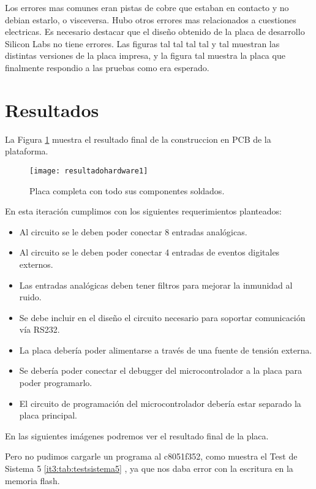 Los errores mas comunes eran pistas de cobre que estaban en contacto y no debian estarlo, o visceversa. Hubo otros errores mas relacionados a cuestiones electricas. Es necesario destacar que el diseño obtenido de la placa de desarrollo Silicon Labs no tiene errores. Las figuras tal tal tal tal y tal muestran las distintas versiones de la placa impresa, y la figura tal muestra la placa que finalmente respondio a las pruebas como era esperado.




\section{Resultados} %
\label{it3:sec:resultados}
La Figura \ref{fig:resultadohardware1} muestra el resultado final de la construccion en PCB de la plataforma.

\begin{figure}[h]
  \centering
  \texttt{[image: resultadohardware1]}
  \caption{Placa completa con todo sus componentes soldados.}\label{fig:resultadohardware1}
\end{figure}

En esta iteración cumplimos con los siguientes requerimientos planteados:
\begin{itemize}
  \item Al circuito se le deben poder conectar 8 entradas analógicas.
  \item Al circuito se le deben poder conectar 4 entradas de eventos digitales externos.
  \item Las entradas analógicas deben tener filtros para mejorar la inmunidad al ruido.
  \item Se debe incluir en el diseño el circuito necesario para soportar comunicación vía RS232.
  \item La placa debería poder alimentarse a través de una fuente de tensión externa.
  \item Se debería poder conectar el debugger del microcontrolador a la placa para poder programarlo.
  \item El circuito de programación del microcontrolador debería estar separado la placa principal.
\end{itemize}

En las siguientes imágenes podremos ver el resultado final de la placa.

Pero no pudimos cargarle un programa al c8051f352, como muestra el Test de Sistema 5 \ref{it3:tab:testsistema5} , ya que nos daba error con la escritura en la memoria flash.

